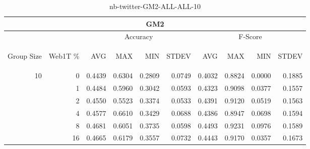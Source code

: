 \begin{center}
\begin{table}[htbp]
\begin{center}
\begin{tabular}{ | r | r | r | r | r | r | r | r | r | r |}
\hline
\multicolumn{10}{|c|}{GM2}\\
\hline
 & & \multicolumn{4}{|c|}{Accuracy} & \multicolumn{4}{|c|}{F-Score}\\ \cline{3-10}
\begin{sideways}Group Size\end{sideways} & \begin{sideways}Web1T \%\end{sideways} & \begin{sideways}AVG\end{sideways} & \begin{sideways}MAX\end{sideways} & \begin{sideways}MIN\end{sideways} & \begin{sideways}STDEV\end{sideways} & \begin{sideways}AVG\end{sideways} & \begin{sideways}MAX\end{sideways} & \begin{sideways}MIN\end{sideways} & \begin{sideways}STDEV\end{sideways}\\
\hline
\multirow{5}{*}{10}
 & 0 & 0.4439 & 0.6304 & 0.2809 & 0.0749 & 0.4032 & 0.8824 & 0.0000 & 0.1885\\ \cline{2-10}
 & 1 & 0.4484 & 0.5960 & 0.3042 & 0.0593 & 0.4323 & 0.9098 & 0.0377 & 0.1557\\ \cline{2-10}
 & 2 & 0.4550 & 0.5523 & 0.3374 & 0.0533 & 0.4391 & 0.9120 & 0.0519 & 0.1563\\ \cline{2-10}
 & 4 & 0.4577 & 0.6610 & 0.3429 & 0.0688 & 0.4386 & 0.8947 & 0.0698 & 0.1594\\ \cline{2-10}
 & 8 & 0.4681 & 0.6051 & 0.3735 & 0.0598 & 0.4493 & 0.9231 & 0.0976 & 0.1589\\ \cline{2-10}
 & 16 & 0.4665 & 0.6179 & 0.3557 & 0.0732 & 0.4443 & 0.9170 & 0.0357 & 0.1673\\ \cline{2-10}
\hline
\end{tabular}
\caption{nb-twitter-GM2-ALL-ALL-10}
\label{table:nb-twitter-GM2-ALL-ALL-10}
\end{center}
\end{table}
\end{center}


